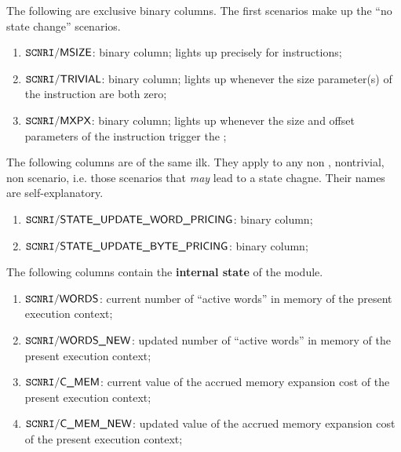 The following are exclusive binary columns.
The first scenarios make up the ``no state change'' scenarios.
\begin{enumerate}
	\item $\texttt{SCNRI}\textsf{/}{\textsf{MSIZE}}$:
		binary column;
		lights up precisely for  instructions;
	\item $\texttt{SCNRI}\textsf{/}{\textsf{TRIVIAL}}$:
		binary column;
		lights up whenever the size parameter(s) of the instruction are both zero;
	\item $\texttt{SCNRI}\textsf{/}{\textsf{MXPX}}$:
		binary column;
		lights up whenever the size and offset parameters of the instruction trigger the \mxpxSH{};
\end{enumerate}
The following columns are of the same ilk.
They apply to any
non ,
nontrivial,
non \mxpxSH{} scenario,
i.e. those scenarios that \emph{may} lead to a state chagne.
Their names are self-explanatory.
\begin{enumerate}[resume]
	\item $\texttt{SCNRI}\textsf{/}{\textsf{STATE\_UPDATE\_WORD\_PRICING}}$:
		binary column;
	\item $\texttt{SCNRI}\textsf{/}{\textsf{STATE\_UPDATE\_BYTE\_PRICING}}$:
		binary column;
\end{enumerate}
The following columns contain the \textbf{internal state} of the \mxpMod{} module.
\begin{enumerate}[resume]
	\item $\texttt{SCNRI}\textsf{/}{\textsf{\textsf{WORDS}}}$:
		current number of ``active words'' in memory of the present execution context;
	\item $\texttt{SCNRI}\textsf{/}{\textsf{\textsf{WORDS\_NEW}}}$:
		updated number of ``active words'' in memory of the present execution context;
	\item $\texttt{SCNRI}\textsf{/}{\textsf{\textsf{C\_MEM}}}$:
		current value of the accrued memory expansion cost of the present execution context;
	\item $\texttt{SCNRI}\textsf{/}{\textsf{\textsf{C\_MEM\_NEW}}}$:
		updated value of the accrued memory expansion cost of the present execution context;
\end{enumerate}
